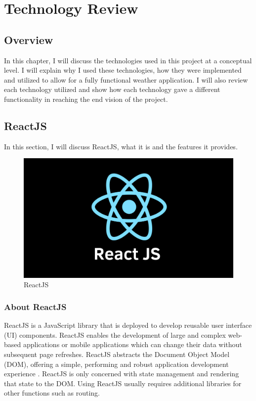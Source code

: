 \chapter{Technology Review}
\section{Overview}
In this chapter, I will discuss the technologies used in this project at a conceptual level. I will explain why I used these technologies, how they were implemented and utilized to allow for a fully functional weather application. I will also review each technology utilized and show how each technology gave a different functionality in reaching the end vision of the project. 

\section{ReactJS}
In this section, I will discuss ReactJS, what it is and the features it provides.

\begin{figure}[h]
\centering
\includegraphics[scale=0.2]{img/ReactJS.png}
\caption{ReactJS}
\label{React}
\end{figure}

\subsection{About ReactJS}
ReactJS is a JavaScript library that is deployed to develop reusable user interface (UI) components. ReactJS enables the development of large and complex web-based applications or mobile applications which can change their data without subsequent page refreshes. ReactJS abstracts the Document Object Model (DOM), offering a simple, performing and robust application development experience \cite{aggarwal2018modern}. ReactJS is only concerned with state management and rendering that state to the DOM. Using ReactJS usually requires additional libraries for other functions such as routing.


